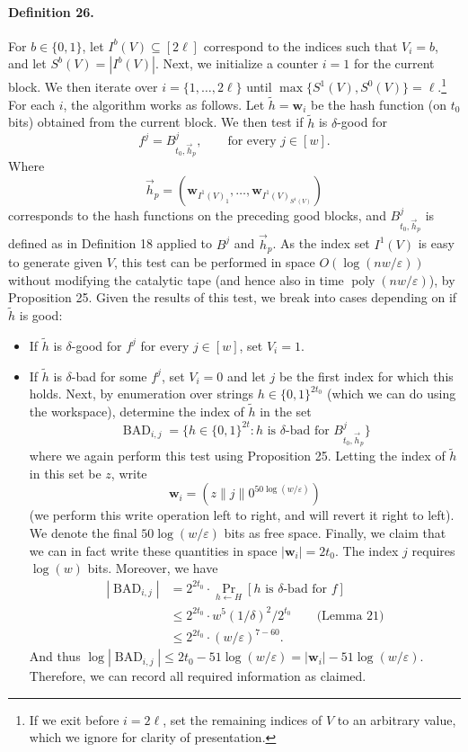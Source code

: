 \paragraph{Definition 26.} For $b\in\{0,1\}$, let $I^b(V)\subseteq[2\ell]$ correspond to the indices such that $V_i=b$, and let $S^b(V)=|I^b(V)|$.
Next, we initialize a counter $i=1$ for the current block. We then iterate over $i=\{1,\ldots,2\ell\}$ until $\max\{S^1(V),S^0(V)\}=\ell$.\footnote{If we exit before $i=2\ell$, set the remaining indices of $V$ to an arbitrary value, which we ignore for clarity of presentation.} For each $i$, the algorithm works as follows. Let $\widetilde h=\mathbf w_i$ be the hash function (on $t_0$ bits) obtained from the current block. We then test if $\widetilde h$ is $\delta$-good for
\[f^j=B^j_{t_0,\vec h_p},\qquad\text{for every }j\in[w].\]
Where
\[\vec h_p=(\mathbf w_{I^1(V)_1},\ldots,\mathbf w_{I^1(V)_{S^1(V)}})\]
corresponds to the hash functions on the preceding good blocks, and $B^j_{t_0,\vec h_p}$ is defined as in Definition 18 applied to $B^j$ and $\vec h_p$. As the index set $I^1(V)$ is easy to generate given $V$, this test can be performed in space $O(\log(nw/\varepsilon))$ without modifying the catalytic tape (and hence also in time $\operatorname{poly}(nw/\varepsilon)$), by Proposition 25.
Given the results of this test, we break into cases depending on if $\widetilde h$ is good:
\begin{itemize}
\item If $\widetilde h$ is $\delta$-good for $f^j$ for every $j\in[w]$, set $V_i=1$.
\item If $\widetilde h$ is $\delta$-bad for some $f^j$, set $V_i=0$ and let $j$ be the first index for which this holds. Next, by enumeration over strings $h\in\{0,1\}^{2t_0}$ (which we can do using the workspace), determine the index of $\widetilde h$ in the set
\[\operatorname{BAD}_{i,j}=\{h\in\{0,1\}^{2t}:h\text{ is }\delta\text{-bad for }B^j_{t_0,\vec h_p}\}\]
where we again perform this test using Proposition 25. Letting the index of $\widetilde h$ in this set be $z$, write
\[\mathbf w_i=(z\|j\|0^{50\log(w/\varepsilon)})\]
(we perform this write operation left to right, and will revert it right to left). We denote the final $50\log(w/\varepsilon)$ bits as free space.
Finally, we claim that we can in fact write these quantities in space $|\mathbf w_i|=2t_0$. The index $j$ requires $\log(w)$ bits. Moreover, we have
\begin{align*}
|\operatorname{BAD}_{i,j}|&=2^{2t_0}\cdot\Pr_{h\leftarrow H}[h\text{ is }\delta\text{-bad for }f]\\
&\leq2^{2t_0}\cdot w^5(1/\delta)^2/2^{t_0}\qquad\text{(Lemma 21)}\\
&\leq2^{2t_0}\cdot(w/\varepsilon)^{7-60}.
\end{align*}
And thus $\log|\operatorname{BAD}_{i,j}|\leq2t_0-51\log(w/\varepsilon)=|\mathbf w_i|-51\log(w/\varepsilon)$. Therefore, we can record all required information as claimed.
\end{itemize}
